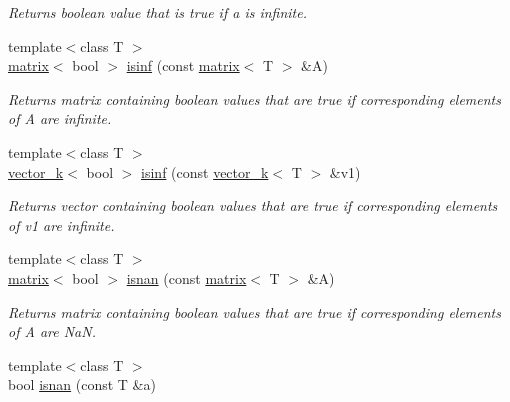 \begin{DoxyCompactItemize}
\begin{DoxyCompactList}\small\item\em Returns boolean value that is true if a is infinite. \end{DoxyCompactList}\item 
\hypertarget{namespacekeycpp_abf12e8a9c04720e074328bb1d34dce04}{{\footnotesize template$<$class T $>$ }\\\hyperlink{classkeycpp_1_1matrix}{matrix}$<$ bool $>$ \hyperlink{namespacekeycpp_abf12e8a9c04720e074328bb1d34dce04}{isinf} (const \hyperlink{classkeycpp_1_1matrix}{matrix}$<$ T $>$ \&A)}\label{namespacekeycpp_abf12e8a9c04720e074328bb1d34dce04}

\begin{DoxyCompactList}\small\item\em Returns matrix containing boolean values that are true if corresponding elements of A are infinite. \end{DoxyCompactList}\item 
\hypertarget{namespacekeycpp_af104a680d8727dc0653925a834764ab4}{{\footnotesize template$<$class T $>$ }\\\hyperlink{classkeycpp_1_1vector__k}{vector\-\_\-k}$<$ bool $>$ \hyperlink{namespacekeycpp_af104a680d8727dc0653925a834764ab4}{isinf} (const \hyperlink{classkeycpp_1_1vector__k}{vector\-\_\-k}$<$ T $>$ \&v1)}\label{namespacekeycpp_af104a680d8727dc0653925a834764ab4}

\begin{DoxyCompactList}\small\item\em Returns vector containing boolean values that are true if corresponding elements of v1 are infinite. \end{DoxyCompactList}\item 
\hypertarget{namespacekeycpp_ad3b16064066dc041be364e6fbefa173a}{{\footnotesize template$<$class T $>$ }\\\hyperlink{classkeycpp_1_1matrix}{matrix}$<$ bool $>$ \hyperlink{namespacekeycpp_ad3b16064066dc041be364e6fbefa173a}{isnan} (const \hyperlink{classkeycpp_1_1matrix}{matrix}$<$ T $>$ \&A)}\label{namespacekeycpp_ad3b16064066dc041be364e6fbefa173a}

\begin{DoxyCompactList}\small\item\em Returns matrix containing boolean values that are true if corresponding elements of A are Na\-N. \end{DoxyCompactList}\item 
\hypertarget{namespacekeycpp_ad91dbdf14632d313a304d3ddbadf935f}{{\footnotesize template$<$class T $>$ }\\bool \hyperlink{namespacekeycpp_ad91dbdf14632d313a304d3ddbadf935f}{isnan} (const T \&a)}\label{namespacekeycpp_ad91dbdf14632d313a304d3ddbadf935f}


\end{DoxyCompactItemize}
